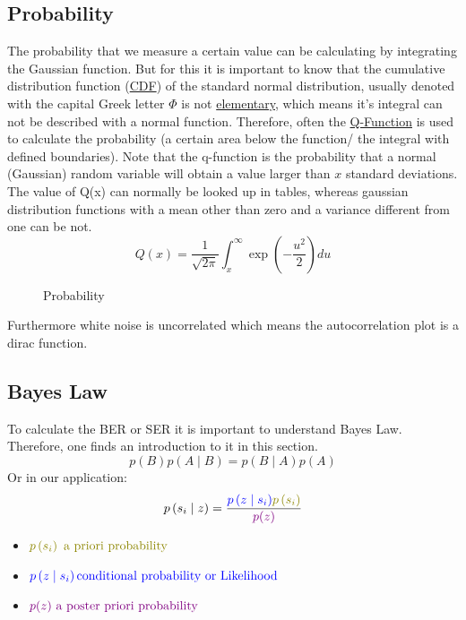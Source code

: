 \subsection{Probability}
The probability that we measure a certain value can be calculating by integrating the Gaussian function. But for this it is important to know that the cumulative distribution function (\href{https://en.wikipedia.org/wiki/Cumulative_distribution_function}{CDF}) of the standard normal distribution, usually denoted with the capital Greek letter $\Phi$ is not \href{https://en.wikipedia.org/wiki/Elementary_function}{elementary}, which means it's integral can not be described with a normal function. Therefore, often the \href{https://en.wikipedia.org/wiki/Q-function#Bounds_and_approximations}{Q-Function} is used to calculate the probability (a certain area below the function/ the integral with defined boundaries). Note that the q-function is the probability that a normal (Gaussian) random variable will obtain a value larger than $x$ standard deviations. The value of Q(x) can normally be looked up in tables, whereas gaussian distribution functions with a mean other than zero and a variance different from one can be not.
$$
Q(x)=\frac{1}{\sqrt{2 \pi}} \int_x^{\infty} \exp \left(-\frac{u^2}{2}\right) d u
$$
\begin{figure}[ht]
  \centering
  \caption{Probability}
  \label{fig:probability1}
\end{figure}
Furthermore white noise is uncorrelated which means the autocorrelation plot is a dirac function.
\subsection{Bayes Law}
To calculate the BER or SER it is important to understand Bayes Law. Therefore, one finds an introduction to it in this section.
\begin{equation}
p(B) p(A \mid B)=p(B \mid A) p(A)
\end{equation}
Or in our application:
\begin{equation} \label{eq:map_1}
p\left(s_i \mid z\right)=\frac{\textcolor{blue}{p\left(z \mid s_i\right)} \textcolor{olive}{p\left(s_i\right)}}{\textcolor{violet}{p(z)}}
\end{equation}
\begin{itemize}
\item $\textcolor{olive}{p\left(s_i\right)\text{ a priori probability}}$
\item $\textcolor{blue}{p\left(z \mid s_i\right)\text{conditional probability or Likelihood}}$
\item $\textcolor{violet}{{p(z)}\text{ a poster priori probability}}$
\end{itemize}
